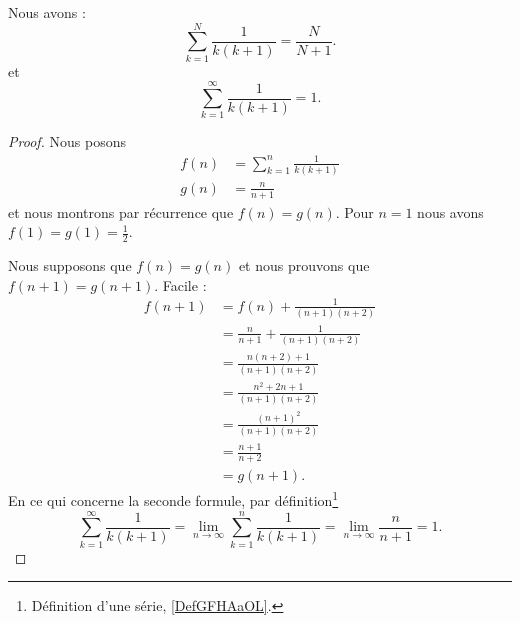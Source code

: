 \begin{lemma}     \label{LEMooKDHPooPlFTIT}
    Nous avons :
    \begin{equation}
        \sum_{k=1}^N\frac{1}{ k(k+1) }=\frac{ N }{ N+1 }.
    \end{equation}
    et
    \begin{equation}
        \sum_{k=1}^{\infty}\frac{1}{ k(k+1) }=1.
    \end{equation}
\end{lemma}

\begin{proof}
    Nous posons
    \begin{subequations}
        \begin{align}
            f(n)&=\sum_{k=1}^n\frac{1}{ k(k+1) }\\
            g(n)&=\frac{ n }{ n+1 }
        \end{align}
    \end{subequations}
    et nous montrons par récurrence que \( f(n)=g(n)\). Pour \( n=1\) nous avons \( f(1)=g(1)=\frac{ 1 }{2}\).

    Nous supposons que \( f(n)=g(n)\) et nous prouvons que \( f(n+1)=g(n+1)\). Facile :
    \begin{subequations}
        \begin{align}
            f(n+1)&=f(n)+\frac{1}{ (n+1)(n+2) }\\
            &=\frac{ n }{ n+1 }+\frac{1}{ (n+1)(n+2) }\\
            &=\frac{ n(n+2)+1 }{ (n+1)(n+2) }\\
            &=\frac{ n^2+2n+1 }{ (n+1)(n+2) }\\
            &=\frac{ (n+1)^2 }{ (n+1)(n+2) }\\
            &=\frac{ n+1 }{ n+2 }\\
            &=g(n+1).
        \end{align}
    \end{subequations}
    En ce qui concerne la seconde formule, par définition\footnote{Définition d'une série, \ref{DefGFHAaOL}.}
    \begin{equation}
        \sum_{k=1}^{\infty}\frac{1}{ k(k+1) }=\lim_{n\to \infty} \sum_{k=1}^n\frac{1}{ k(k+1) }=\lim_{n\to \infty}\frac{ n }{ n+1 } =1.
    \end{equation}
\end{proof}

